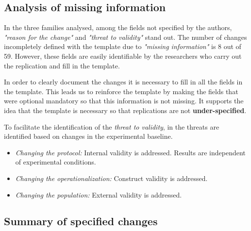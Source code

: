 \subsection{Analysis of missing information}
\label{sec:missing}

In the three families analysed, among the fields not specified by the authors, \emph{"reason for the change"} and \emph{ "threat to validity"} stand out.   
The number of changes incompletely defined with the template due to \emph{"missing information"} is 8 out of 59. However, these fields are easily identifiable by the researchers who carry out the replication and fill in the template.

In order to clearly document the changes it is necessary to fill in all the fields in the template. This leads us to reinforce the template by making the fields that were optional mandatory so that this information is not missing.
It supports the idea that the template is necessary so that replications are not \textbf{under-specified}. 

To facilitate the identification of the \emph{threat to validity}, in \cite{gomez2014understanding} the threats are identified based on changes in the experimental baseline.

\begin{itemize}
\item \emph{Changing the protocol:} Internal validity is addressed. Results are independent of experimental conditions.
\item \emph{Changing the operationalization:} Construct validity is addressed. %
\item \emph{Changing the population:} External validity is addressed. %

\end{itemize}
%
%



\subsection{Summary of specified changes}
\label{sec:summary}

